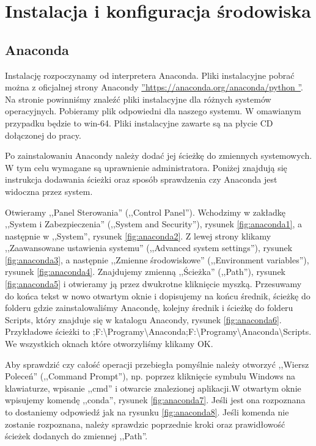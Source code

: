 \section{Instalacja i konfiguracja środowiska}
\label{sec:instalacja}

\subsection{Anaconda}
\label{sec:anaconda}

Instalację rozpoczynamy od interpretera Anaconda. Pliki instalacyjne pobrać można z oficjalnej strony Anacondy \hyperref[anaconda]{''https://anaconda.org/anaconda/python ''}. Na stronie powinniśmy znaleźć pliki instalacyjne dla różnych systemów operacyjnych. Pobieramy plik odpowiedni dla naszego systemu. W omawianym przypadku będzie to win-64. Pliki instalacyjne zawarte są na płycie CD dołączonej do pracy.

Po zainstalowaniu Anacondy należy dodać jej ścieżkę do zmiennych systemowych. W tym celu wymagane są uprawnienie administratora. Poniżej znajdują się instrukcja dodawania ścieżki oraz sposób sprawdzenia czy Anaconda jest widoczna przez system.

Otwieramy ,,Panel Sterowania'' (,,Control Panel''). Wchodzimy w zakładkę ,,System i Zabezpieczenia'' (,,System and Security''), rysunek \ref{fig:anaconda1}, a następnie w ,,System'', rysunek \ref{fig:anaconda2}. Z lewej strony klikamy ,,Zaawansowane ustawienia systemu'' (,,Advanced system settings''), rysunek \ref{fig:anaconda3}, a następnie
,,Zmienne środowiskowe'' (,,Environment variables''), rysunek \ref{fig:anaconda4}. Znajdujemy zmienną ,,Ścieżka'' (,,Path''), rysunek \ref{fig:anaconda5} i otwieramy ją przez dwukrotne kliknięcie myszką. Przesuwamy do końca tekst w nowo otwartym oknie i dopisujemy na końcu średnik, ścieżkę do folderu gdzie zainstalowaliśmy Anacondę, kolejny średnik i ścieżkę do folderu Scripts, który znajduje się w katalogu Anacondy, rysunek \ref{fig:anaconda6}. Przykładowe ścieżki to ;F:\textbackslash Programy\textbackslash Anaconda;F:\textbackslash Programy\textbackslash Anaconda\textbackslash Scripts. We wszystkich oknach które otworzyliśmy klikamy OK.

Aby sprawdzić czy całość operacji przebiegła pomyślnie należy otworzyć ,,Wiersz Poleceń'' (,,Command Prompt''), np. poprzez kliknięcie symbulu Windows na klawiaturze, wpisanie ,,cmd'' i otwarcie znalezionej aplikacji.W otwartym oknie wpisujemy komendę ,,conda'', rysunek \ref{fig:anaconda7}.  Jeśli jest ona rozpoznana to dostaniemy odpowiedź jak na rysunku \ref{fig:anaconda8}. Jeśli komenda nie zostanie rozpoznana, należy sprawdzic poprzednie kroki oraz prawidłowość ścieżek dodanych do zmiennej ,,Path''.

